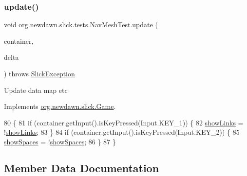 \subsubsection{\texorpdfstring{update()}{update()}}
{\footnotesize\ttfamily void org.\+newdawn.\+slick.\+tests.\+Nav\+Mesh\+Test.\+update (\begin{DoxyParamCaption}\item[{\mbox{\hyperlink{classorg_1_1newdawn_1_1slick_1_1_game_container}{Game\+Container}}}]{container,  }\item[{int}]{delta }\end{DoxyParamCaption}) throws \mbox{\hyperlink{classorg_1_1newdawn_1_1slick_1_1_slick_exception}{Slick\+Exception}}\hspace{0.3cm}{\ttfamily [inline]}}

Update data map etc 

Implements \mbox{\hyperlink{interfaceorg_1_1newdawn_1_1slick_1_1_game_ab07b2e9463ee4631620dde0de25bdee8}{org.\+newdawn.\+slick.\+Game}}.


\begin{DoxyCode}
80                                   \{
81         \textcolor{keywordflow}{if} (container.getInput().isKeyPressed(Input.KEY\_1)) \{
82             \mbox{\hyperlink{classorg_1_1newdawn_1_1slick_1_1tests_1_1_nav_mesh_test_a9772bf7261a81d51464c164952f994f6}{showLinks}} = !\mbox{\hyperlink{classorg_1_1newdawn_1_1slick_1_1tests_1_1_nav_mesh_test_a9772bf7261a81d51464c164952f994f6}{showLinks}};
83         \}
84         \textcolor{keywordflow}{if} (container.getInput().isKeyPressed(Input.KEY\_2)) \{
85             \mbox{\hyperlink{classorg_1_1newdawn_1_1slick_1_1tests_1_1_nav_mesh_test_a786e92a28b21e3b89be1ad5bd4ccac66}{showSpaces}} = !\mbox{\hyperlink{classorg_1_1newdawn_1_1slick_1_1tests_1_1_nav_mesh_test_a786e92a28b21e3b89be1ad5bd4ccac66}{showSpaces}};
86         \}
87     \}
\end{DoxyCode}


\subsection{Member Data Documentation}
\mbox{\label{classorg_1_1newdawn_1_1slick_1_1tests_1_1_nav_mesh_test_a35070b13da5425ae0c75b8b0a6295560}} 
